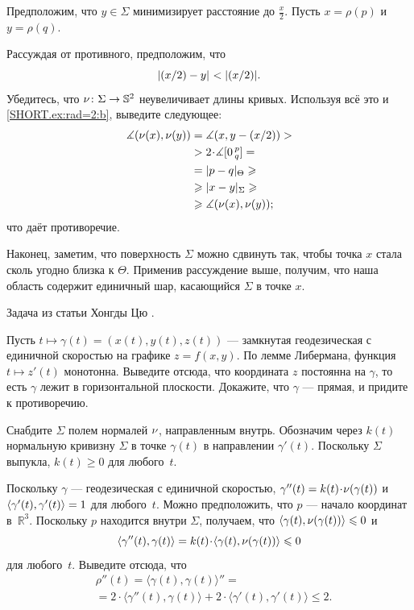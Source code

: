 Предположим, что \( y\in \Sigma \) минимизирует расстояние до \( \tfrac x2 \).
Пусть \( x=\rho(p) \) и \( y=\rho(q) \).

Рассуждая от противного, предположим, что
\[\dist{\tfrac x2}{y}{}\z<|\tfrac x2|.\]
Убедитесь, что \(\nu\colon \Sigma\to \mathbb{S}^2 \) неувеличивает длины кривых.
Используя всё это и \ref{SHORT.ex:rad=2:b}, выведите следующее:
\begin{align*}
\measuredangle(\Norm(x),\Norm(y))&= \measuredangle(x,y-\tfrac x2)>
\\
&>2\cdot\measuredangle\hinge 0pq=
\\
&=\dist{p}{q}{\Theta}\ge
\\
&\ge\dist{x}{y}{\Sigma}\ge
\\
&\ge\measuredangle(\Norm(x),\Norm(y));
\end{align*}
что даёт противоречие.

Наконец, заметим, что поверхность \( \Sigma \) можно сдвинуть так, чтобы точка \( x \) стала сколь угодно близка к \( \Theta \).
Применив рассуждение выше, получим, что наша область содержит единичный шар, касающийся \(\Sigma\) в точке \(x\).

 Задача из статьи Хонгды Цю \cite{qiu2025}.

Пусть $t\mapsto \gamma(t)=(x(t),y(t),z(t))$ --- замкнутая геодезическая с единичной скоростью на графике $z=f(x,y)$.
По лемме Либермана, функция $t\mapsto z'(t)$ монотонна.
Выведите отсюда, что координата $z$ постоянна на $\gamma$, то есть $\gamma$ лежит в горизонтальной плоскости.
Докажите, что $\gamma$ --- прямая, и придите к противоречию.

Снабдите $\Sigma$ полем нормалей $\nu$, направленным внутрь.
Обозначим через $k(t)$ нормальную кривизну $\Sigma$ в точке $\gamma(t)$ в направлении $\gamma'(t)$.
Поскольку $\Sigma$ выпукла, $k(t)\ge 0$ для любого~$t$.

Поскольку $\gamma$ --- геодезическая с единичной скоростью, $\gamma''(t)=k(t)\cdot\Norm(\gamma(t))$ и $\langle\gamma'(t),\gamma'(t)\rangle\z=1$ для любого~$t$.
Можно предположить, что $p$ --- начало координат в~$\mathbb{R}^3$.
Поскольку $p$ находится внутри $\Sigma$, получаем, что $\langle\gamma(t),\nu(\gamma(t))\rangle\leqslant 0$ и
\[
\langle\gamma''(t),\gamma(t)\rangle=k(t)\cdot \langle\gamma(t),\Norm(\gamma(t))\rangle\le 0
\]
для любого~$t$.
Выведите отсюда, что
\begin{align*}
&\rho''(t)
=\langle\gamma(t),\gamma(t)\rangle''=
\\
&=2\cdot\langle\gamma''(t),\gamma(t)\rangle+2\cdot\langle\gamma'(t),\gamma'(t)\rangle\le 2.
\end{align*}

